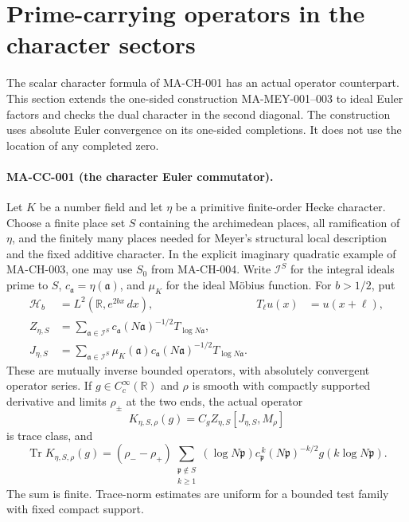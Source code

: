 \section{Prime-carrying operators in the character sectors}
\label{sec:character-commutator}

The scalar character formula of MA-CH-001 has an actual operator
counterpart.  This section extends the one-sided construction
MA-MEY-001--003 to ideal Euler factors and checks the dual character
in the second diagonal.  The construction uses absolute Euler
convergence on its one-sided completions.  It does not use the
location of any completed zero.

\paragraph{MA-CC-001 (the character Euler commutator).}
Let $K$ be a number field and let $\eta$ be a primitive finite-order
Hecke character.  Choose a finite place set $S$ containing the
archimedean places, all ramification of $\eta$, and the finitely
many places needed for Meyer's structural local description and
the fixed additive character.  In the explicit imaginary quadratic
example of MA-CH-003, one may use $S_0$ from MA-CH-004.
Write $\mathscr I^S$ for the integral ideals prime to $S$,
$c_{\mathfrak a}=\eta(\mathfrak a)$, and $\mu_K$ for the ideal
M\"obius function.  For $b>1/2$, put
\[
\begin{aligned}
 \mathcal H_b&=L^2(\mathbb R,e^{2bx}\,dx),
       &T_\ell u(x)&=u(x+\ell),\\
 Z_{\eta,S}&=\sum_{\mathfrak a\in\mathscr I^S}
       c_{\mathfrak a}(N\mathfrak a)^{-1/2}
                         T_{\log N\mathfrak a},\\
 J_{\eta,S}&=\sum_{\mathfrak a\in\mathscr I^S}
       \mu_K(\mathfrak a)c_{\mathfrak a}
       (N\mathfrak a)^{-1/2}T_{\log N\mathfrak a}.
\end{aligned}
\tag{MA-CC.1}
\]
These are mutually inverse bounded operators, with absolutely
convergent operator series.  If $g\in C_c^\infty(\mathbb R)$ and
$\rho$ is smooth with compactly supported derivative and limits
$\rho_\pm$ at the two ends, the actual operator
\[
 K_{\eta,S,\rho}(g)
   =C_g Z_{\eta,S}[J_{\eta,S},M_\rho]
\tag{MA-CC.2}
\]
is trace class, and
\[
 \operatorname{Tr}K_{\eta,S,\rho}(g)
  =(\rho_- -\rho_+)
       \sum_{\substack{\mathfrak p\notin S\\k\ge1}}
       (\log N\mathfrak p)c_{\mathfrak p}^{\,k}
       (N\mathfrak p)^{-k/2}g(k\log N\mathfrak p).
\tag{MA-CC.3}
\]
The sum is finite.  Trace-norm estimates are uniform for a bounded
test family with fixed compact support.

